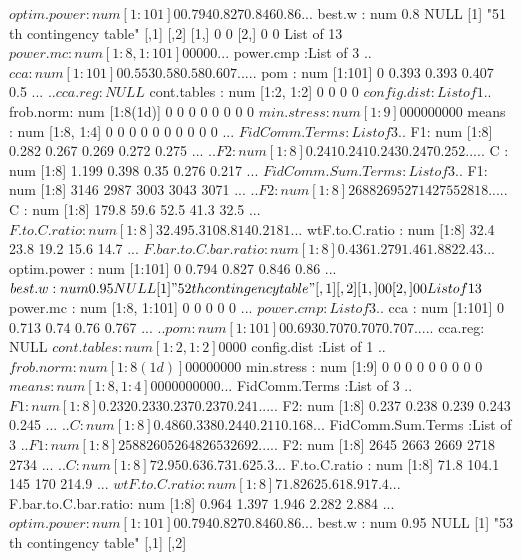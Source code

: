\documentclass[11pt]{article} %
\begin{document}
\begin{Schunk}
\begin{Soutput}
 $ optim.power         : num [1:101] 0 0.794 0.827 0.846 0.86 ...
 $ best.w              : num 0.8
NULL
[1] "51 th contingency table"
     [,1] [,2]
[1,]    0    0
[2,]    0    0
List of 13
 $ power.mc            : num [1:8, 1:101] 0 0 0 0 0 ...
 $ power.cmp           :List of 3
  ..$ cca    : num [1:101] 0 0.553 0.58 0.58 0.607 ...
  ..$ pom    : num [1:101] 0 0.393 0.393 0.407 0.5 ...
  ..$ cca.reg: NULL
 $ cont.tables         : num [1:2, 1:2] 0 0 0 0
 $ config.dist         :List of 1
  ..$ frob.norm: num [1:8(1d)] 0 0 0 0 0 0 0 0
 $ min.stress          : num [1:9] 0 0 0 0 0 0 0 0 0
 $ means               : num [1:8, 1:4] 0 0 0 0 0 0 0 0 0 0 ...
 $ FidComm.Terms       :List of 3
  ..$ F1: num [1:8] 0.282 0.267 0.269 0.272 0.275 ...
  ..$ F2: num [1:8] 0.241 0.241 0.243 0.247 0.252 ...
  ..$ C : num [1:8] 1.199 0.398 0.35 0.276 0.217 ...
 $ FidComm.Sum.Terms   :List of 3
  ..$ F1: num [1:8] 3146 2987 3003 3043 3071 ...
  ..$ F2: num [1:8] 2688 2695 2714 2755 2818 ...
  ..$ C : num [1:8] 179.8 59.6 52.5 41.3 32.5 ...
 $ F.to.C.ratio        : num [1:8] 32.4 95.3 108.8 140.2 181 ...
 $ wtF.to.C.ratio      : num [1:8] 32.4 23.8 19.2 15.6 14.7 ...
 $ F.bar.to.C.bar.ratio: num [1:8] 0.436 1.279 1.46 1.882 2.43 ...
 $ optim.power         : num [1:101] 0 0.794 0.827 0.846 0.86 ...
 $ best.w              : num 0.95
NULL
[1] "52 th contingency table"
     [,1] [,2]
[1,]    0    0
[2,]    0    0
List of 13
 $ power.mc            : num [1:8, 1:101] 0 0 0 0 0 ...
 $ power.cmp           :List of 3
  ..$ cca    : num [1:101] 0 0.713 0.74 0.76 0.767 ...
  ..$ pom    : num [1:101] 0 0.693 0.707 0.707 0.707 ...
  ..$ cca.reg: NULL
 $ cont.tables         : num [1:2, 1:2] 0 0 0 0
 $ config.dist         :List of 1
  ..$ frob.norm: num [1:8(1d)] 0 0 0 0 0 0 0 0
 $ min.stress          : num [1:9] 0 0 0 0 0 0 0 0 0
 $ means               : num [1:8, 1:4] 0 0 0 0 0 0 0 0 0 0 ...
 $ FidComm.Terms       :List of 3
  ..$ F1: num [1:8] 0.232 0.233 0.237 0.237 0.241 ...
  ..$ F2: num [1:8] 0.237 0.238 0.239 0.243 0.245 ...
  ..$ C : num [1:8] 0.486 0.338 0.244 0.211 0.168 ...
 $ FidComm.Sum.Terms   :List of 3
  ..$ F1: num [1:8] 2588 2605 2648 2653 2692 ...
  ..$ F2: num [1:8] 2645 2663 2669 2718 2734 ...
  ..$ C : num [1:8] 72.9 50.6 36.7 31.6 25.3 ...
 $ F.to.C.ratio        : num [1:8] 71.8 104.1 145 170 214.9 ...
 $ wtF.to.C.ratio      : num [1:8] 71.8 26 25.6 18.9 17.4 ...
 $ F.bar.to.C.bar.ratio: num [1:8] 0.964 1.397 1.946 2.282 2.884 ...
 $ optim.power         : num [1:101] 0 0.794 0.827 0.846 0.86 ...
 $ best.w              : num 0.95
NULL
[1] "53 th contingency table"
     [,1] [,2]

\end{Soutput}
\end{Schunk}
\end{document}
